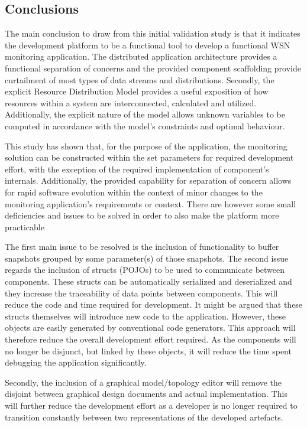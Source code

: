 \subsection{Conclusions}
The main conclusion to draw from this initial validation study is that it indicates the development platform to be a functional tool to develop a functional WSN monitoring application. The distributed application architecture provides a functional separation of concerns and the provided component scaffolding provide curtailment of most types of data streams and distributions. Secondly, the explicit Resource Distribution Model provides a useful exposition of how resources within a system are interconnected, calculated and utilized. Additionally, the explicit nature of the model allows unknown variables to be computed in accordance with the model's constraints and optimal behaviour.

This study has shown that, for the purpose of the \idsystems \sensit application, the monitoring solution can be constructed within the set parameters for required development effort, with the exception of the required implementation of component's internals. Additionally, the provided capability for separation of concern allows for rapid software evolution within the context of minor changes to the monitoring application's requirements or context. There are however some small deficiencies and issues to be solved in order to also make the platform more practicable

The first main issue to be resolved is the inclusion of functionality to buffer snapshots grouped by some parameter(s) of those snapshots. The second issue regards the inclusion of structs (POJOs) to be used to communicate between components. These structs can be automatically serialized and deserialized and they increase the traceability of data points between components. This will reduce the code and time required for development. It might be argued that these structs themselves will introduce new code to the application. However, these objects are easily generated by conventional code generators. This approach will therefore reduce the overall development effort required. As the components will no longer be disjunct, but linked by these objects, it will reduce the time spent debugging the application significantly.

Secondly, the inclusion of a graphical model/topology editor will remove the disjoint between graphical design documents and actual implementation. This will further reduce the development effort as a developer is no longer required to transition constantly between two representations of the developed artefacts.

